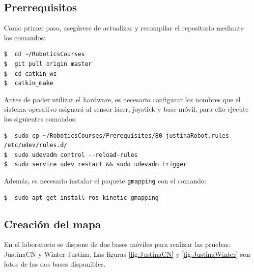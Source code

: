 \documentclass[letterpaper,12pt]{article}
\begin{document}
\subsection{Prerrequisitos}
Como primer paso, asegúrese de actualizar y recompilar el repositorio mediante los comandos:
\begin{verbatim}
$  cd ~/RoboticsCourses
$  git pull origin master
$  cd catkin_ws
$  catkin_make
\end{verbatim}

Antes de poder utilizar el hardware, es necesario configurar los nombres que el sistema operativo asignará al sensor láser, joystick y base móvil, para ello ejecute los siguientes comandos:
\begin{verbatim}
$  sudo cp ~/RoboticsCourses/Prerequisites/80-justinaRobot.rules /etc/udev/rules.d/
$  sudo udevadm control --reload-rules
$  sudo service udev restart && sudo udevadm trigger
\end{verbatim}

Además, es necesario instalar el paquete \texttt{gmapping} con el comando:
\begin{verbatim}
$  sudo apt-get install ros-kinetic-gmapping
\end{verbatim}

\subsection{Creación del mapa}
En el laboratorio se dispone de dos bases móviles para realizar las pruebas: JustinaCN y Winter Justina. Las figuras \ref{fig:JustinaCN} y 
\ref{fig:JustinaWinter} son fotos de las dos bases disponibles. 
\end{document}
